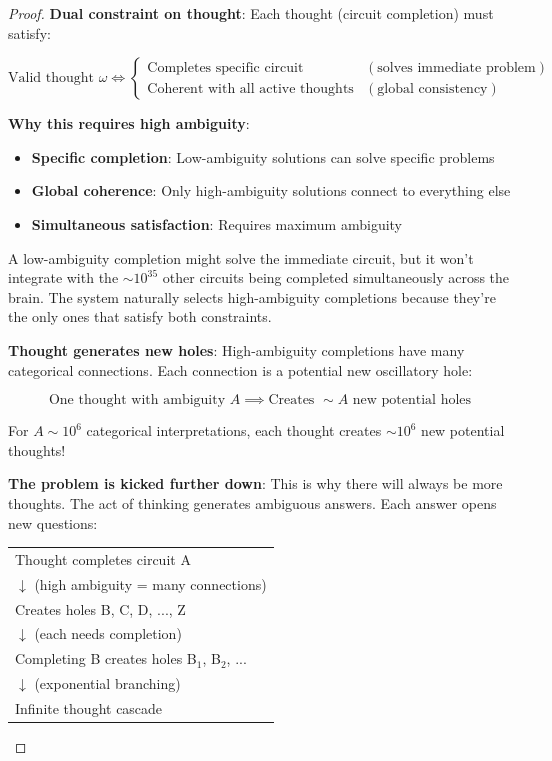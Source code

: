 \documentclass[11pt,a4paper]{article}
\begin{document}
\begin{proof}
\textbf{Dual constraint on thought}: Each thought (circuit completion) must satisfy:

\begin{equation}
\text{Valid thought } \omega \iff \begin{cases}
\text{Completes specific circuit} & (\text{solves immediate problem}) \\
\text{Coherent with all active thoughts} & (\text{global consistency})
\end{cases}
\end{equation}

\textbf{Why this requires high ambiguity}: 
\begin{itemize}
\item \textbf{Specific completion}: Low-ambiguity solutions can solve specific problems
\item \textbf{Global coherence}: Only high-ambiguity solutions connect to everything else
\item \textbf{Simultaneous satisfaction}: Requires maximum ambiguity
\end{itemize}

A low-ambiguity completion might solve the immediate circuit, but it won't integrate with the $\sim 10^{35}$ other circuits being completed simultaneously across the brain. The system naturally selects high-ambiguity completions because they're the only ones that satisfy both constraints.

\textbf{Thought generates new holes}: High-ambiguity completions have many categorical connections. Each connection is a potential new oscillatory hole:

\begin{equation}
\text{One thought with ambiguity } A \implies \text{Creates } \sim A \text{ new potential holes}
\end{equation}

For $A \sim 10^6$ categorical interpretations, each thought creates $\sim 10^6$ new potential thoughts!

\textbf{The problem is kicked further down}: This is why there will always be more thoughts. The act of thinking generates ambiguous answers. Each answer opens new questions:

\begin{center}
\begin{tabular}{l}
Thought completes circuit A \\
$\downarrow$ (high ambiguity = many connections) \\
Creates holes B, C, D, ..., Z \\
$\downarrow$ (each needs completion) \\
Completing B creates holes B$_1$, B$_2$, ... \\
$\downarrow$ (exponential branching) \\
Infinite thought cascade
\end{tabular}
\end{center}


\end{proof}
\end{document}
